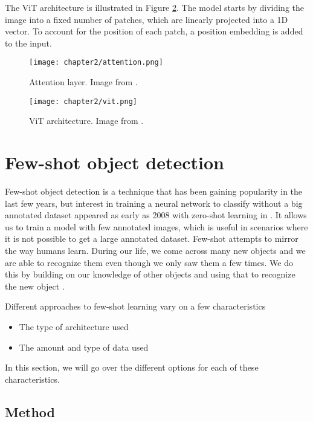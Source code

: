 The ViT architecture is illustrated in Figure \ref{fig:2_vit}. The model starts by dividing the image into a fixed number of patches, which are linearly projected into a 1D vector. To account for the position of each patch, a position embedding is added to the input.

\begin{figure}[H]
	\centering
	\texttt{[image: chapter2/attention.png]}
	\caption{\label{fig:2_attention} Attention layer. Image from \citet{transformers}.}
\end{figure}

\begin{figure}[H]
	\centering
	\texttt{[image: chapter2/vit.png]}
	\caption{\label{fig:2_vit} ViT architecture. Image from \citet{vit}.}
\end{figure}




\section{Few-shot object detection}
Few-shot object detection is a technique that has been gaining popularity in the last few years, but interest in training a neural network to classify without a big annotated dataset appeared as early as 2008 with zero-shot learning in \citet{aaai08-132}. It allows us to train a model with few annotated images, which is useful in scenarios where it is not possible to get a large annotated dataset. Few-shot attempts to mirror the way humans learn. During our life, we come across many new objects and we are able to recognize them even though we only saw them a few times. We do this by building on our knowledge of other objects and using that to recognize the new object \cite{biederman1987recognition}. 

Different approaches to few-shot learning vary on a few characteristics
\begin{itemize}
	\item The type of architecture used
	\item The amount and type of data used
\end{itemize}

In this section, we will go over the different options for each of these characteristics.

\subsection{Method}

